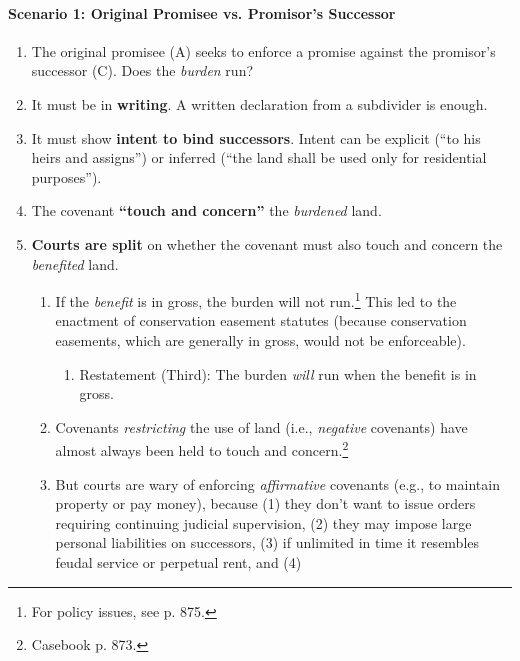 \paragraph{Scenario 1: Original Promisee vs. Promisor's Successor}

\begin{enumerate}
    \item The original promisee (A) seeks to enforce a promise against the 
    promisor's  successor (C). Does the \emph{burden} run?
    \item It must be in \textbf{writing}. A written declaration from a 
    subdivider is enough.
    \item It must show \textbf{intent to bind successors}. Intent can be 
    explicit (``to his heirs and assigns'') or inferred (``the land shall be 
    used only for residential purposes'').
    \item The covenant \textbf{``touch and concern''} the \emph{burdened} land.
    \item \textbf{Courts are split} on whether the covenant must also touch 
    and concern the \emph{benefited} land.
    \begin{enumerate}
        \item If the \emph{benefit} is in gross, the burden will not 
        run.\footnote{For policy issues, see p. 875.} %
        This led to the enactment of conservation easement statutes (because 
        conservation easements, which are generally in gross, would not be 
        enforceable).
        \begin{enumerate}
            \item Restatement (Third): The burden \emph{will} run when the 
            benefit is in gross.
        \end{enumerate}
        \item Covenants \emph{restricting} the use of land (i.e., 
        \emph{negative} covenants) have almost always been held to touch and 
        concern.\footnote{Casebook p. 873.}
        \item But courts are wary of enforcing \emph{affirmative} covenants 
        (e.g., to maintain property or pay money), because (1) they don't want 
        to issue orders requiring continuing judicial supervision, (2) they 
        may impose large personal liabilities on successors, (3) if unlimited 
        in time it resembles feudal service or perpetual rent, and (4) 

\end{enumerate}
\end{enumerate}
